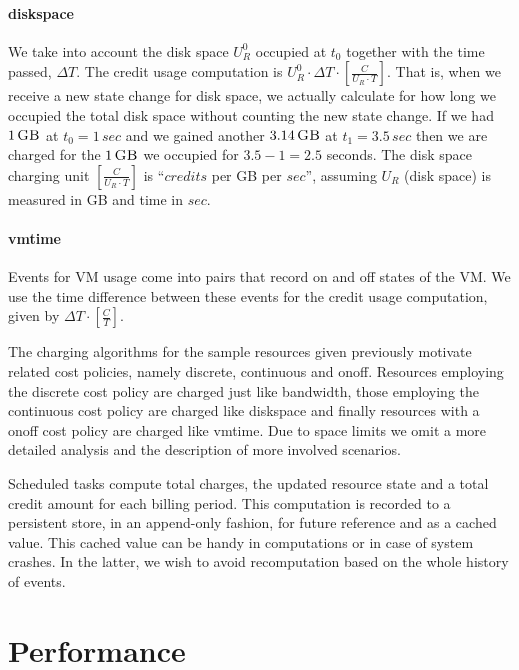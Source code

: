 \documentclass[letterpaper,twocolumn,10pt]{article}
\newcommand{\GB}[1]{\ensuremath{#1\,\mbox{\sc GB}}}
\newcommand{\secs}[1]{\ensuremath{#1\,sec}}
\begin{document}
\paragraph{\textsf{diskspace}}
We take into account the disk space $U_R^0$ occupied at $t_0$ together with the time passed, $\Delta T$. The credit usage computation is $U_R^{0} \cdot \Delta T \cdot [ \frac{C}{U_R \cdot T} ]$.
That is, when we receive a new state change for disk space, we actually calculate for how long we occupied the total disk space without counting the new state change. If we had \GB{1} at $t_0 = \secs{1}$ and we gained another \GB{3.14} at $t_1 = \secs{3.5}$ then we are charged for the \GB{1} we occupied for $3.5 - 1 = 2.5$ seconds. The disk space charging unit $[ \frac{C}{U_R \cdot T} ]$ is ``$credits$ per {\sc GB} per $sec$'', assuming $U_R$ (disk space) is measured in {\sc GB} and time in $sec$.


\paragraph{\textsf{vmtime}}
Events for VM usage come into pairs that record \textsf{on} and \textsf{off} states of the VM. We use the time difference between these events for the credit usage computation, given by $\Delta T \cdot [ \frac{C}{T} ]$.


The charging algorithms for the sample resources given previously motivate related cost policies, namely \textsf{discrete}, \textsf{continuous} and \textsf{onoff}. Resources employing the \textsf{discrete} cost policy are charged just like \textsf{bandwidth}, those employing the \textsf{continuous} cost policy are charged like \textsf{diskspace} and finally resources with a \textsf{onoff} cost policy are charged like \textsf{vmtime}. Due to space limits we omit a more detailed analysis and the description of more involved scenarios.

Scheduled tasks compute total charges, the updated resource state and
a total credit amount for each billing period. This computation is
recorded to a persistent store, in an append-only fashion, for future
reference and as a cached value. This cached value can be handy in
computations or in case of system crashes. In the latter, we wish to
avoid recomputation based on the whole history of events.

\section{Performance}
\end{document}
